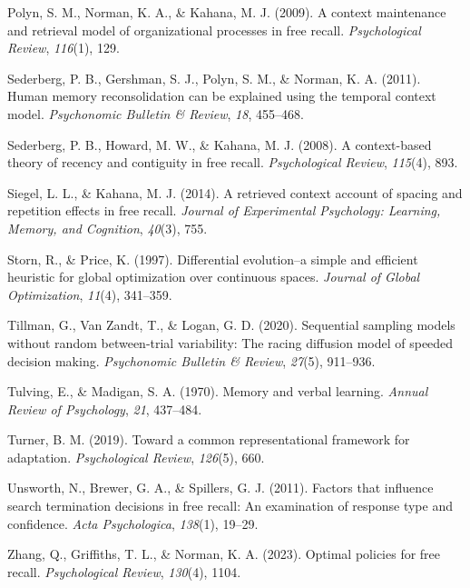 \documentclass[
  man,
  floatsintext,
  longtable,
  nolmodern,
  notxfonts,
  notimes,
  draftfirst,
  colorlinks=true,linkcolor=blue,citecolor=blue,urlcolor=blue]{apa7}
\newlength{\cslhangindent}
\newenvironment{CSLReferences}[2] %
 {\begin{list}{}{%
  \setlength{\itemindent}{0pt}
  \setlength{\leftmargin}{0pt}
  \setlength{\parsep}{0pt}
  \ifodd #1
   \setlength{\leftmargin}{\cslhangindent}
   \setlength{\itemindent}{-1\cslhangindent}
  \fi
  \setlength{\itemsep}{#2\baselineskip}}}
 {\end{list}}
\begin{document}
\begin{CSLReferences}{1}{0}
Polyn, S. M., Norman, K. A., \& Kahana, M. J. (2009). A context
maintenance and retrieval model of organizational processes in free
recall. \emph{Psychological Review}, \emph{116}(1), 129.

Sederberg, P. B., Gershman, S. J., Polyn, S. M., \& Norman, K. A.
(2011). Human memory reconsolidation can be explained using the temporal
context model. \emph{Psychonomic Bulletin \& Review}, \emph{18},
455--468.

Sederberg, P. B., Howard, M. W., \& Kahana, M. J. (2008). A
context-based theory of recency and contiguity in free recall.
\emph{Psychological Review}, \emph{115}(4), 893.

Siegel, L. L., \& Kahana, M. J. (2014). A retrieved context account of
spacing and repetition effects in free recall. \emph{Journal of
Experimental Psychology: Learning, Memory, and Cognition}, \emph{40}(3),
755.

Storn, R., \& Price, K. (1997). Differential evolution--a simple and
efficient heuristic for global optimization over continuous spaces.
\emph{Journal of Global Optimization}, \emph{11}(4), 341--359.

Tillman, G., Van Zandt, T., \& Logan, G. D. (2020). Sequential sampling
models without random between-trial variability: The racing diffusion
model of speeded decision making. \emph{Psychonomic Bulletin \& Review},
\emph{27}(5), 911--936.

Tulving, E., \& Madigan, S. A. (1970). Memory and verbal learning.
\emph{Annual Review of Psychology}, \emph{21}, 437--484.

Turner, B. M. (2019). Toward a common representational framework for
adaptation. \emph{Psychological Review}, \emph{126}(5), 660.

Unsworth, N., Brewer, G. A., \& Spillers, G. J. (2011). Factors that
influence search termination decisions in free recall: An examination of
response type and confidence. \emph{Acta Psychologica}, \emph{138}(1),
19--29.

Zhang, Q., Griffiths, T. L., \& Norman, K. A. (2023). Optimal policies
for free recall. \emph{Psychological Review}, \emph{130}(4), 1104.

\end{CSLReferences}
\end{document}
